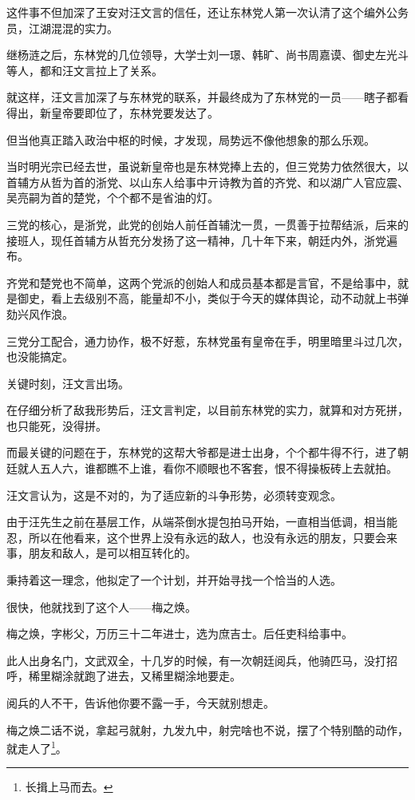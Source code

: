 \begin{multicols}{\theparacolNo}
这件事不但加深了王安对汪文言的信任，还让东林党人第一次认清了这个编外公务员，江湖混混的实力。

继杨涟之后，东林党的几位领导，大学士刘一璟、韩旷、尚书周嘉谟、御史左光斗等人，都和汪文言拉上了关系。

就这样，汪文言加深了与东林党的联系，并最终成为了东林党的一员——瞎子都看得出，新皇帝要即位了，东林党要发达了。

但当他真正踏入政治中枢的时候，才发现，局势远不像他想象的那么乐观。

当时明光宗已经去世，虽说新皇帝也是东林党捧上去的，但三党势力依然很大，以首辅方从哲为首的浙党、以山东人给事中亓诗教为首的齐党、和以湖广人官应震、吴亮嗣为首的楚党，个个都不是省油的灯。

三党的核心，是浙党，此党的创始人前任首辅沈一贯，一贯善于拉帮结派，后来的接班人，现任首辅方从哲充分发扬了这一精神，几十年下来，朝廷内外，浙党遍布。

齐党和楚党也不简单，这两个党派的创始人和成员基本都是言官，不是给事中，就是御史，看上去级别不高，能量却不小，类似于今天的媒体舆论，动不动就上书弹劾兴风作浪。

三党分工配合，通力协作，极不好惹，东林党虽有皇帝在手，明里暗里斗过几次，也没能搞定。

关键时刻，汪文言出场。

在仔细分析了敌我形势后，汪文言判定，以目前东林党的实力，就算和对方死拼，也只能死，没得拼。

而最关键的问题在于，东林党的这帮大爷都是进士出身，个个都牛得不行，进了朝廷就人五人六，谁都瞧不上谁，看你不顺眼也不客套，恨不得操板砖上去就拍。

汪文言认为，这是不对的，为了适应新的斗争形势，必须转变观念。

由于汪先生之前在基层工作，从端茶倒水提包拍马开始，一直相当低调，相当能忍，所以在他看来，这个世界上没有永远的敌人，也没有永远的朋友，只要会来事，朋友和敌人，是可以相互转化的。

秉持着这一理念，他拟定了一个计划，并开始寻找一个恰当的人选。

很快，他就找到了这个人——梅之焕。

梅之焕，字彬父，万历三十二年进士，选为庶吉士。后任吏科给事中。

此人出身名门，文武双全，十几岁的时候，有一次朝廷阅兵，他骑匹马，没打招呼，稀里糊涂就跑了进去，又稀里糊涂地要走。

阅兵的人不干，告诉他你要不露一手，今天就别想走。

梅之焕二话不说，拿起弓就射，九发九中，射完啥也不说，摆了个特别酷的动作，就走人了\footnote{长揖上马而去。}。


\end{multicols}
